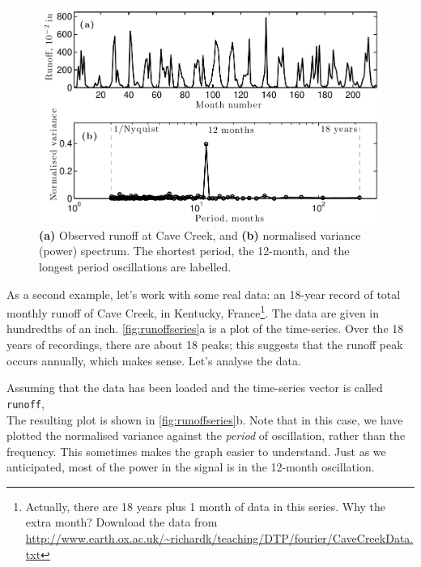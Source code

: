 \documentclass[11pt,twoside,a4paper]{article}
\begin{document}
\begin{figure}[bt]
  \centering
  \includegraphics[width=5in]{../figs/L15/SeriesAndSpectrum_2}
  \caption{\textbf{(a)} Observed runoff at Cave Creek, and
    \textbf{(b)} normalised variance (power) spectrum. The shortest
    period, the 12-month, and the longest period oscillations are
    labelled. }
  \label{fig:runoffseries}
\end{figure}

As a second example, let's work with some real data: an 18-year record
of total monthly runoff of Cave Creek, in Kentucky,
France\footnote{Actually, there are 18 years plus 1 month of data in
  this series.  Why the extra month? Download the data from
  \url{http://www.earth.ox.ac.uk/~richardk/teaching/DTP/fourier/CaveCreekData.txt}}.
The data are given in hundredths of an inch.
\autoref{fig:runoffseries}a is a plot of the time-series.  Over the 18
years of recordings, there are about 18 peaks; this suggests that the
runoff peak occurs annually, which makes sense.  Let's analyse the
data.

Assuming that the data has been loaded and the time-series vector is
called \texttt{runoff},
\\[1mm]
The resulting plot is shown in \autoref{fig:runoffseries}b.  Note that
in this case, we have plotted the normalised variance against the
\textit{period} of oscillation, rather than the frequency.  This
sometimes makes the graph easier to understand.  Just as we
anticipated, most of the power in the signal is in the 12-month
oscillation. 
\end{document}
